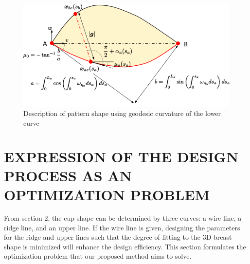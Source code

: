 \documentclass[E]{scitrans}
\begin{document}
\begin{figure}[thpb]
	\centering
	\includegraphics[width = \columnwidth]{./figure/PatternImage2.png}
	\caption{Description of pattern shape using geodesic curvature of the lower curve}
	\label{fig:PatternImage}
\end{figure}
\section*{EXPRESSION OF THE DESIGN PROCESS AS AN OPTIMIZATION PROBLEM}
From section 2, the cup shape can be determined by three curves: a wire line, a ridge line, and an upper line. If the wire line is given, designing the parameters for the ridge and upper lines such that the degree of fitting to the 3D breast shape is minimized will enhance the design efficiency. This section formulates the optimization problem that our proposed method aims to solve.
\end{document}
